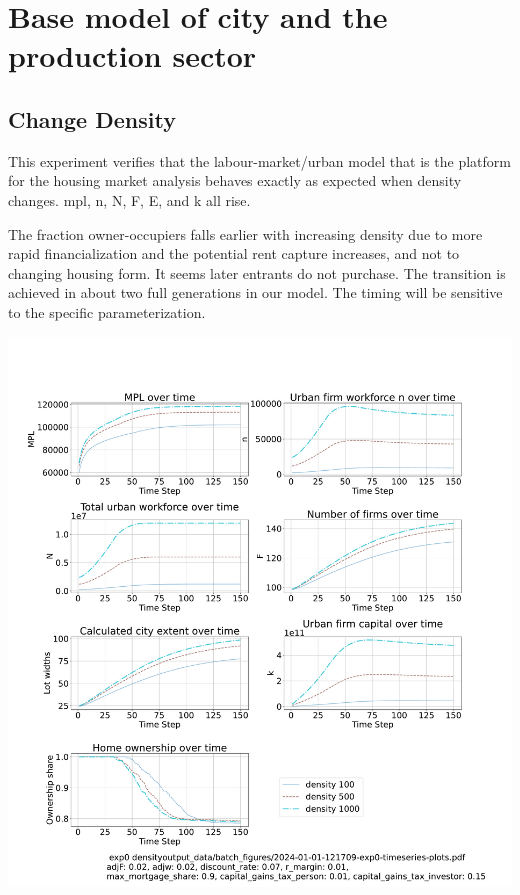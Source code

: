 \documentclass{article}
\begin{document}

\section{Base model of city and the production sector}
 \subsection{Change Density}
 This experiment verifies that the labour-market/urban model that is the platform for the housing market analysis behaves exactly as expected when density changes. mpl, n, N, F, E, and k all rise. %

 The fraction owner-occupiers falls earlier with increasing density due to more rapid financialization and the potential rent capture increases, and  not to changing housing form. It seems later entrants do not purchase. The transition is achieved in about two full generations  in our model. The timing will be sensitive to the specific parameterization.
 

 \hspace*{-2cm}\includegraphics[trim= 1.5cm 3.65cm 2cm 4.0cm, clip, scale=.3]{Density-3-150.pdf}
\end{document}
